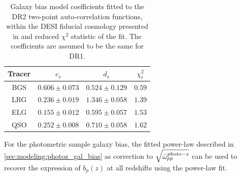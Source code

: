 {\renewcommand{\arraystretch}{1.2}
\begin{table}[h]
\centering
\caption{Galaxy bias model coefficients fitted to the DR2 two-point auto-correlation functions, within the DESI fiducial cosmology presented in \cite{DESI.2024.III.FiducialCosmology.BAO} and reduced $\chi^2$ statistic of the fit. The coefficients are assumed to be the same for DR1.}
\begin{tabular}{c|c|c|c}
\hline
\textbf{Tracer} & $c_s$ & $d_s$ & $\chi^2_\mathrm{r}$\\
\hline
BGS & $0.606\pm{0.073}$ & $0.524\pm{0.129}$ & $0.59$ \\
LRG & $0.236\pm{0.019}$ & $1.346\pm{0.058}$ & $1.39$\\
ELG & $0.155\pm{0.012}$ & $0.595\pm{0.057}$ & $1.53$ \\ 
QSO & $0.252\pm{0.008}$ & $0.710\pm{0.058}$ & $1.62$ \\
\end{tabular}
\label{tab:galaxy_bias}
\end{table}
}

For the photometric sample galaxy bias, the fitted power-law described in \ref{sec:modeling:photoz_gal_bias} as correction to $\sqrt{\bar{\omega}_{pp}^{\mathrm{photo}-z}}$ can be used to recover the expression of $b_p(z)$ at all redshifts using the power-law fit.


